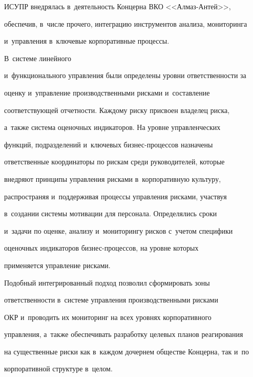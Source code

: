       


      ИСУПР внедрялась в~деятельность Концерна ВКО <<Алмаз-Антей>>, 


обеспечив, в~числе прочего, интеграцию инструментов анализа, мониторинга 


и~управ\-ле\-ния в~ключевые корпоративные процессы. 


В~сис\-те\-ме линейного 


и~функционального управления были определены уровни ответственности за 


оценку и~управление производственными рисками и~составление 


соответствующей отчетности. Каждому риску присвоен владелец риска, 


а~также сис\-те\-ма оценочных индикаторов. На уровне управ\-лен\-че\-ских 


функций, подразделений и~ключевых биз\-нес-про\-цес\-сов назначены 


ответственные координаторы по рис\-кам среди руководителей, которые 


внедряют принципы управления рис\-ка\-ми в~корпоративную культуру, 


распространяя и~поддерживая процессы управ\-ле\-ния рисками, участвуя 


в~создании сис\-те\-мы мотивации для персонала. Определялись сроки 


и~задачи по оценке, анализу и~мониторингу рисков с~учетом специфики 


оценочных индикаторов биз\-нес-про\-цес\-сов, на уровне которых 


применяется управ\-ле\-ние рисками.


      


      Подобный интегрированный подход позволил сформировать зоны 


ответственности в~сис\-те\-ме управ\-ле\-ния производственными рисками 


ОКР и~проводить их мониторинг на всех уровнях корпоративного 


управления, а~так\-же обеспечивать разработку целевых планов реагирования 


на существенные рис\-ки как в~каждом дочернем обществе Концерна, так и~по 


корпоративной структуре в~целом.










